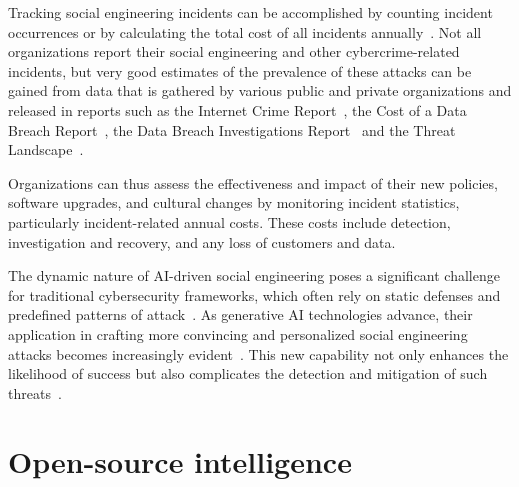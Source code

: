 %
%
Tracking social engineering incidents can be accomplished by counting incident occurrences or by calculating the total cost of all incidents annually~\citep{ibm_Cost_Data_Breach_Report_2024}. Not all organizations report their social engineering and other cybercrime-related incidents, but very good estimates of the prevalence of these attacks can be gained from data that is gathered by various public and private organizations and released in reports such as the Internet Crime Report~\citep{fbi_Internet_Crime_Report_2023}, the Cost of a Data Breach Report~\citep{ibm_Cost_Data_Breach_Report_2024}, the Data Breach Investigations Report~\citep{verizon_Data_Breach_Investigations_Report_2024} and the Threat Landscape~\citep{eniza_Threat_Landscape_2024}. 

Organizations can thus assess the effectiveness and impact of their new policies, software upgrades, and cultural changes by monitoring incident statistics, particularly incident-related annual costs. These costs include detection, investigation and recovery, and any loss of customers and data. %






%
%
The dynamic nature of AI-driven social engineering poses a significant challenge for traditional cybersecurity frameworks, which often rely on static defenses and predefined patterns of attack~\citep{fakhouri_AI_Driven_Solutions_SE_Attacks_2024}. As generative AI technologies advance, their application in crafting more convincing and personalized social engineering attacks becomes increasingly evident~\citep{blauth_AI_Crime_Overview_Malicious_Use_Abuse_2022}. This new capability not only enhances the likelihood of success but also complicates the detection and mitigation of such threats~\citep{mirsky_Threat_Offensive_AI_Organizations_2023}.











\section{Open-source intelligence}
\begin{comment}
Some case studies highlighting the use of OSINT in real-world social engineering incidents?
\end{comment}

